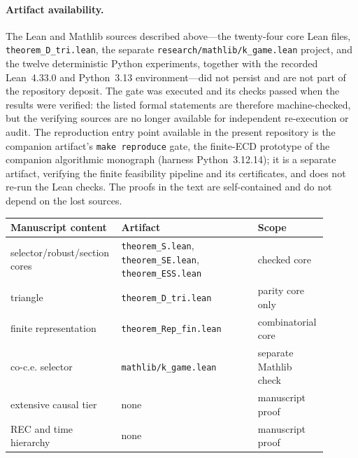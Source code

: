\documentclass[11pt]{article}
\theoremstyle{plain}
\theoremstyle{definition}
\theoremstyle{remark}
\begin{document}
\paragraph*{Artifact availability.}
The Lean and Mathlib sources described above---the twenty-four core Lean files,
\texttt{theorem\_D\_tri.lean}, the separate \texttt{research/mathlib/k\_game.lean}
project, and the twelve deterministic Python experiments, together with the
recorded Lean~4.33.0 and Python~3.13 environment---did not persist and are not
part of the repository deposit. The gate was executed and its checks passed
when the results were verified: the listed formal statements are therefore
machine-checked, but the verifying sources are no longer available for
independent re-execution or audit. The reproduction entry point available in
the present repository is the companion artifact's \texttt{make reproduce}
gate, the finite-ECD prototype of the companion algorithmic monograph (harness
Python~3.12.14); it is a separate artifact, verifying the finite feasibility
pipeline and its certificates, and does not re-run the Lean checks. The proofs
in the text are self-contained and do not depend on the lost sources.

\begin{center}
\begin{tabular}{@{}p{0.30\linewidth}p{0.42\linewidth}p{0.18\linewidth}@{}}
\toprule
Manuscript content & Artifact & Scope\\
\midrule
selector/robust/section cores & \texttt{theorem\_S.lean}, \texttt{theorem\_SE.lean}, \texttt{theorem\_ESS.lean} & checked core\\
triangle & \texttt{theorem\_D\_tri.lean} & parity core only\\
finite representation & \texttt{theorem\_Rep\_fin.lean} & combinatorial core\\
co-c.e. selector & \texttt{mathlib/k\_game.lean} & separate Mathlib check\\
extensive causal tier & none & manuscript proof\\
REC and time hierarchy & none & manuscript proof\\
\bottomrule
\end{tabular}
\end{center}
\end{document}
